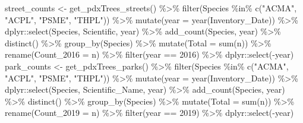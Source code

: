 \documentclass[12pt,twoside]{reedthesis}
\newenvironment{Shaded}{\begin{snugshade}}{\end{snugshade}}
\newcommand{\AttributeTok}[1]{\textcolor[rgb]{0.77,0.63,0.00}{#1}}
\newcommand{\DecValTok}[1]{\textcolor[rgb]{0.00,0.00,0.81}{#1}}
\newcommand{\FunctionTok}[1]{\textcolor[rgb]{0.00,0.00,0.00}{#1}}
\newcommand{\NormalTok}[1]{#1}
\newcommand{\OtherTok}[1]{\textcolor[rgb]{0.56,0.35,0.01}{#1}}
\newcommand{\SpecialCharTok}[1]{\textcolor[rgb]{0.00,0.00,0.00}{#1}}
\newcommand{\StringTok}[1]{\textcolor[rgb]{0.31,0.60,0.02}{#1}}
\begin{document}
\footnotesize
\begin{Shaded}
\begin{Highlighting}[]
\NormalTok{street\_counts }\OtherTok{\textless{}{-}} \FunctionTok{get\_pdxTrees\_streets}\NormalTok{() }\SpecialCharTok{\%\textgreater{}\%}
    \FunctionTok{filter}\NormalTok{(Species }\SpecialCharTok{\%in\%} \FunctionTok{c}\NormalTok{(}\StringTok{"ACMA"}\NormalTok{, }\StringTok{"ACPL"}\NormalTok{, }\StringTok{"PSME"}\NormalTok{, }\StringTok{"THPL"}\NormalTok{)) }\SpecialCharTok{\%\textgreater{}\%}
    \FunctionTok{mutate}\NormalTok{(}\AttributeTok{year =} \FunctionTok{year}\NormalTok{(Inventory\_Date)) }\SpecialCharTok{\%\textgreater{}\%}
\NormalTok{    dplyr}\SpecialCharTok{::}\FunctionTok{select}\NormalTok{(Species, Scientific, year) }\SpecialCharTok{\%\textgreater{}\%}
    \FunctionTok{add\_count}\NormalTok{(Species, year) }\SpecialCharTok{\%\textgreater{}\%}
    \FunctionTok{distinct}\NormalTok{() }\SpecialCharTok{\%\textgreater{}\%}
    \FunctionTok{group\_by}\NormalTok{(Species) }\SpecialCharTok{\%\textgreater{}\%}
    \FunctionTok{mutate}\NormalTok{(}\AttributeTok{Total =} \FunctionTok{sum}\NormalTok{(n)) }\SpecialCharTok{\%\textgreater{}\%}
    \FunctionTok{rename}\NormalTok{(}\AttributeTok{Count\_2016 =}\NormalTok{ n) }\SpecialCharTok{\%\textgreater{}\%}
    \FunctionTok{filter}\NormalTok{(year }\SpecialCharTok{==} \DecValTok{2016}\NormalTok{) }\SpecialCharTok{\%\textgreater{}\%}
\NormalTok{    dplyr}\SpecialCharTok{::}\FunctionTok{select}\NormalTok{(}\SpecialCharTok{{-}}\NormalTok{year)}
\NormalTok{park\_counts }\OtherTok{\textless{}{-}} \FunctionTok{get\_pdxTrees\_parks}\NormalTok{() }\SpecialCharTok{\%\textgreater{}\%}
    \FunctionTok{filter}\NormalTok{(Species }\SpecialCharTok{\%in\%} \FunctionTok{c}\NormalTok{(}\StringTok{"ACMA"}\NormalTok{, }\StringTok{"ACPL"}\NormalTok{, }\StringTok{"PSME"}\NormalTok{, }\StringTok{"THPL"}\NormalTok{)) }\SpecialCharTok{\%\textgreater{}\%}
    \FunctionTok{mutate}\NormalTok{(}\AttributeTok{year =} \FunctionTok{year}\NormalTok{(Inventory\_Date)) }\SpecialCharTok{\%\textgreater{}\%}
\NormalTok{    dplyr}\SpecialCharTok{::}\FunctionTok{select}\NormalTok{(Species, Scientific\_Name, year) }\SpecialCharTok{\%\textgreater{}\%}
    \FunctionTok{add\_count}\NormalTok{(Species, year) }\SpecialCharTok{\%\textgreater{}\%}
    \FunctionTok{distinct}\NormalTok{() }\SpecialCharTok{\%\textgreater{}\%}
    \FunctionTok{group\_by}\NormalTok{(Species) }\SpecialCharTok{\%\textgreater{}\%}
    \FunctionTok{mutate}\NormalTok{(}\AttributeTok{Total =} \FunctionTok{sum}\NormalTok{(n)) }\SpecialCharTok{\%\textgreater{}\%}
    \FunctionTok{rename}\NormalTok{(}\AttributeTok{Count\_2019 =}\NormalTok{ n) }\SpecialCharTok{\%\textgreater{}\%}
    \FunctionTok{filter}\NormalTok{(year }\SpecialCharTok{==} \DecValTok{2019}\NormalTok{) }\SpecialCharTok{\%\textgreater{}\%}
\NormalTok{    dplyr}\SpecialCharTok{::}\FunctionTok{select}\NormalTok{(}\SpecialCharTok{{-}}\NormalTok{year)}
\end{Highlighting}
\end{Shaded}
\normalsize
\end{document}
